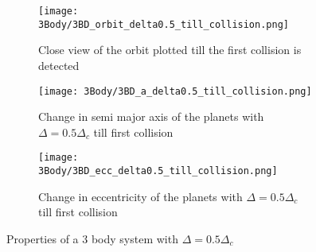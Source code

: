 \documentclass[12pt,a4paper]{article}
\begin{document}
\begin{figure}[H]
  \centering
  \begin{subfigure}{0.4\textwidth}
    \centering
    \texttt{[image: 3Body/3BD\_orbit\_delta0.5\_till\_collision.png]}
    \caption{Close view of the orbit plotted till the first collision is detected}
    \label{fig:3Body_0.5_short}
  \end{subfigure}
  \begin{subfigure}{0.4\textwidth}
    \centering
    \texttt{[image: 3Body/3BD\_a\_delta0.5\_till\_collision.png]}
    \caption{Change in semi major axis of the planets with $\Delta = 0.5\Delta_c$ till first collision}
    \label{fig:3Body_0.5_a}
  \end{subfigure}

  \begin{subfigure}{0.4\textwidth}
    \centering
    \texttt{[image: 3Body/3BD\_ecc\_delta0.5\_till\_collision.png]}
    \caption{Change in eccentricity of the planets with $\Delta = 0.5\Delta_c$ till first collision}
    \label{fig:3Body_0.5_ecc}
  \end{subfigure}
  \caption{Properties of a 3 body system with $\Delta = 0.5\Delta_c$}
\end{figure}
\end{document}
